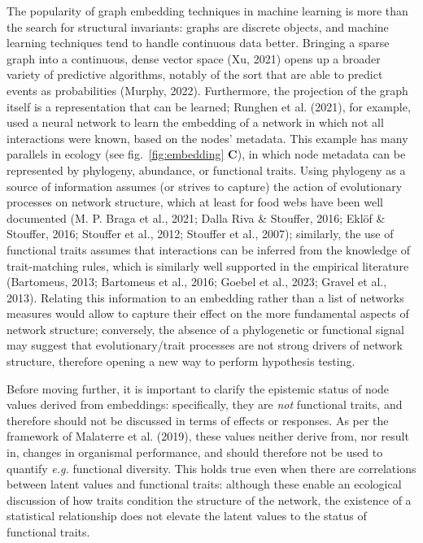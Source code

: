\documentclass[11pt]{article}
\begin{document}
The popularity of graph embedding techniques in machine learning is more
than the search for structural invariants: graphs are discrete objects,
and machine learning techniques tend to handle continuous data better.
Bringing a sparse graph into a continuous, dense vector space (Xu, 2021)
opens up a broader variety of predictive algorithms, notably of the sort
that are able to predict events as probabilities (Murphy, 2022).
Furthermore, the projection of the graph itself is a representation that
can be learned; Runghen et al. (2021), for example, used a neural
network to learn the embedding of a network in which not all
interactions were known, based on the nodes' metadata. This example has
many parallels in ecology (see fig.~\ref{fig:embedding} \textbf{C}), in
which node metadata can be represented by phylogeny, abundance, or
functional traits. Using phylogeny as a source of information assumes
(or strives to capture) the action of evolutionary processes on network
structure, which at least for food webs have been well documented (M. P.
Braga et al., 2021; Dalla Riva \& Stouffer, 2016; Eklöf \& Stouffer,
2016; Stouffer et al., 2012; Stouffer et al., 2007); similarly, the use
of functional traits assumes that interactions can be inferred from the
knowledge of trait-matching rules, which is similarly well supported in
the empirical literature (Bartomeus, 2013; Bartomeus et al., 2016;
Goebel et al., 2023; Gravel et al., 2013). Relating this information to
an embedding rather than a list of networks measures would allow to
capture their effect on the more fundamental aspects of network
structure; conversely, the absence of a phylogenetic or functional
signal may suggest that evolutionary/trait processes are not strong
drivers of network structure, therefore opening a new way to perform
hypothesis testing.

Before moving further, it is important to clarify the epistemic status
of node values derived from embeddings: specifically, they are
\emph{not} functional traits, and therefore should not be discussed in
terms of effects or responses. As per the framework of Malaterre et al.
(2019), these values neither derive from, nor result in, changes in
organismal performance, and should therefore not be used to quantify
\emph{e.g.} functional diversity. This holds true even when there are
correlations between latent values and functional traits: although these
enable an ecological discussion of how traits condition the structure of
the network, the existence of a statistical relationship does not
elevate the latent values to the status of functional traits.
\end{document}
